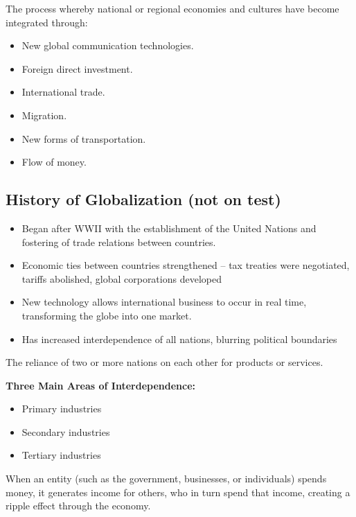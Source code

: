
\begin{definition}[Globalization]
    The process whereby national or regional 
    economies and cultures have become integrated through:
    \begin{itemize}
        \item New global communication technologies.
        \item Foreign direct investment.
        \item International trade.
        \item Migration.
        \item New forms of transportation.
        \item Flow of money.
    \end{itemize}
\end{definition}

\subsection{History of Globalization (not on test)}
\begin{itemize}
    \item Began after WWII with the establishment of the United Nations and fostering of trade relations between countries.
    \item Economic ties between countries strengthened -- tax treaties were negotiated, tariffs abolished, global corporations developed
    \item New technology allows international business to occur in real time, transforming the globe into one market.
    \item Has increased interdependence of all nations, blurring political boundaries
\end{itemize}

\begin{definition}[Interdependence]
    The reliance of two or more nations on each other for products or services.
\end{definition}

\textbf{Three Main Areas of Interdependence:}
\begin{itemize}
    \item Primary industries
    \item Secondary industries 
    \item Tertiary industries
\end{itemize}

\begin{definition}
    When an entity (such as the government, businesses, or individuals) spends money, it generates income for others, who in turn spend that income, creating a ripple effect through the economy.
\end{definition}

